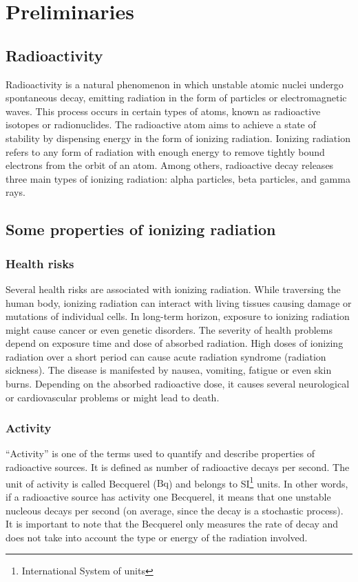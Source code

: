 
\chapter{Preliminaries\label{chap:preliminaries}}

\section{Radioactivity}
Radioactivity is a natural phenomenon in which unstable atomic nuclei undergo spontaneous decay, emitting radiation in the form of particles or electromagnetic waves. 
This process occurs in certain types of atoms, known as radioactive isotopes or radionuclides. 
The radioactive atom aims to achieve a state of stability by dispensing energy in the form of ionizing radiation.
Ionizing radiation refers to any form of radiation with enough energy to remove tightly bound electrons from the orbit of an atom.
Among others, radioactive decay releases three main types of ionizing radiation: alpha particles, beta particles, and gamma rays. 

\section{Some properties of ionizing radiation}

\subsection{Health risks}%
Several health risks are associated with ionizing radiation.
While traversing the human body, ionizing radiation can interact with living tissues causing damage or mutations of individual cells.
In long-term horizon, exposure to ionizing radiation might cause cancer or even genetic disorders.
The severity of health problems depend on exposure time and dose of absorbed radiation.
High doses of ionizing radiation over a short period can cause acute radiation syndrome (radiation sickness).
The disease is manifested by nausea, vomiting, fatigue or even skin burns. 
Depending on the absorbed radioactive dose, it causes several neurological or cardiovascular problems or might lead to death.%

\subsection{Activity}%
``Activity'' is one of the terms used to quantify and describe properties of radioactive sources.
It is defined as number of radioactive decays per second.
The unit of activity is called Becquerel ($\si{\becquerel}$) and belongs to SI\footnote{International System of units} units.
In other words, if a radioactive source has activity one Becquerel, it means that one unstable nucleous decays per second (on average, since the decay is a stochastic process).
It is important to note that the Becquerel only measures the rate of decay and does not take into account the type or energy of the radiation involved.%

